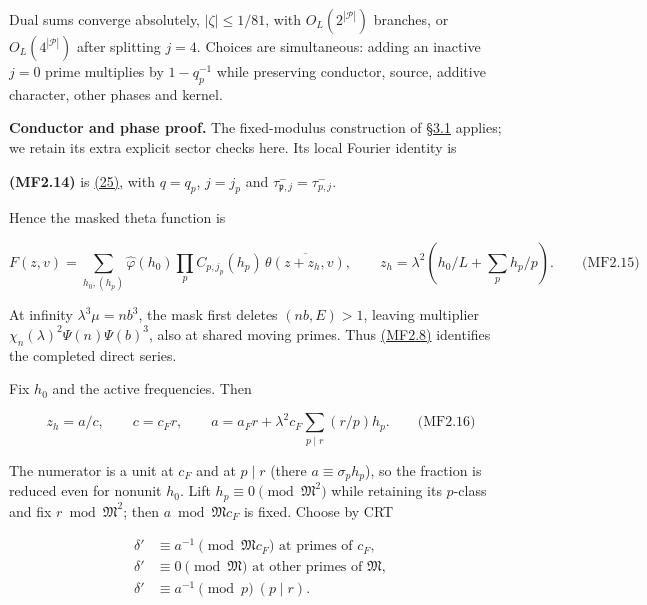 Dual sums converge absolutely, \(|\zeta|\le1/81\), with \(O_L(2^{|\mathcal P|})\) branches, or \(O_L(4^{|\mathcal P|})\) after splitting \(j=4\). Choices are simultaneous: adding an inactive \(j=0\) prime multiplies by \(1-q_p^{-1}\) while preserving conductor, source, additive character, other phases and kernel.

\textbf{Conductor and phase proof.} The fixed-modulus construction of §\protect\hyperlink{cf:reflection}{3.1} applies; we retain its extra explicit sector checks here. Its local Fourier identity is

\hypertarget{mf:eq:B2.14}{}

\label{mf:eq:B2.14}

\textbf{(MF2.14)} is \protect\hyperlink{cf:eq:B.9}{(25)}, with \(q=q_p\), \(j=j_p\) and \(\tau^-_{\mathfrak p,j}=\tau^-_{p,j}\).

Hence the masked theta function is

\hypertarget{mf:eq:B2.15}{}

\label{mf:eq:B2.15}

\[
F(z,v)=\sum_{h_0,(h_p)}
\widehat\varphi(h_0)\prod_pC_{p,j_p}(h_p)\,
\overline{\theta(z+z_h,v)},\qquad
z_h=\lambda^2\left(h_0/L+\sum_ph_p/p\right).
\qquad\text{(MF2.15)}
\]

At infinity \(\lambda^3\mu=nb^3\), the mask first deletes \((nb,E)>1\), leaving multiplier \(\chi_n(\lambda)^2\Psi(n)\Psi(b)^3\), also at shared moving primes. Thus \protect\hyperlink{mf:eq:B2.8}{(MF2.8)} identifies the completed direct series.

Fix \(h_0\) and the active frequencies. Then

\hypertarget{mf:eq:B2.16}{}

\label{mf:eq:B2.16}

\[
z_h=a/c,\qquad c=c_Fr,\qquad
a=a_Fr+\lambda^2c_F\sum_{p\mid r}(r/p)h_p.
\qquad\text{(MF2.16)}
\]

The numerator is a unit at \(c_F\) and at \(p\mid r\) (there \(a\equiv\sigma_ph_p\)), so the fraction is reduced even for nonunit \(h_0\). Lift \(h_p\equiv0\pmod{\mathfrak M^2}\) while retaining its \(p\)-class and fix \(r\bmod\mathfrak M^2\); then \(a\bmod\mathfrak Mc_F\) is fixed. Choose by CRT

\[
\begin{aligned}
\delta'&\equiv a^{-1}\pmod{\mathfrak Mc_F}\text{ at primes of }c_F,\\
\delta'&\equiv0\pmod{\mathfrak M}\text{ at other primes of }\mathfrak M,\\
\delta'&\equiv a^{-1}\pmod p\ (p\mid r).
\end{aligned}
\]


